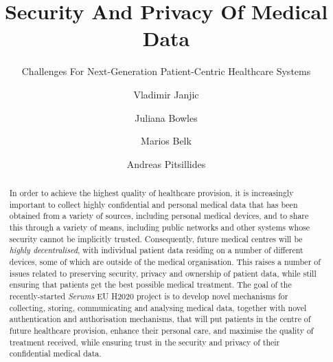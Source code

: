 \documentclass[sigconf]{acmart}
\begin{document}
\title{Security And Privacy Of Medical Data}
\subtitle{Challenges For Next-Generation Patient-Centric Healthcare Systems}



\author{Vladimir Janjic}
\author{Juliana Bowles}

\author{Marios Belk}
\author{Andreas Pitsillides}

\renewcommand{\shortauthors}{Janjic, Bowles, Belk and Pitsilides}

%
\begin{abstract}
In order to achieve the highest quality of healthcare provision, it is increasingly important to collect highly confidential and personal medical data that has been obtained from a variety of sources, including personal medical devices, and to share this through a variety of means, including public networks and other systems whose security cannot be implicitly trusted. Consequently, future medical centres will be \emph{highly decentralised}, with individual patient data residing on a number of different devices, some of which are outside of the medical organisation. This raises a number of issues related to preserving security, privacy and ownership of patient data, while still ensuring that patients get the best possible medical treatment. The goal of the recently-started \emph{Serums} EU H2020 project is to develop novel mechanisms for collecting, storing, communicating and analysing medical data, together with novel authentication and authorisation mechanisms, that will put patients in the centre of future healthcare provision, enhance their personal care, and maximise the quality of treatment received, while ensuring trust in the security and privacy of their confidential medical data. 
\end{abstract}
\end{document}
